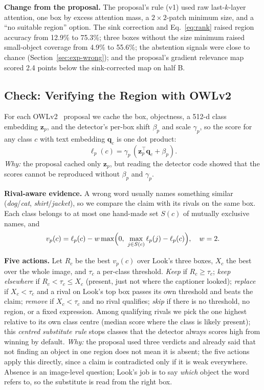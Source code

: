 \documentclass[conference]{IEEEtran}
\begin{document}
\textbf{Change from the proposal.} The proposal's rule (v1) used raw last-$k$-layer attention, one box by
excess attention mass, a $2\times2$-patch minimum size, and a ``no suitable region'' option. The sink
correction and Eq.~\eqref{eq:rank} raised region accuracy from 12.9\% to 75.3\%; three boxes without the size
minimum raised small-object coverage from 4.9\% to 55.6\%; the abstention signals were close to chance
(Section~\ref{sec:exp-wrong}); and the proposal's gradient relevance map~\cite{chefer2021generic} scored 2.4
points below the sink-corrected map on half B.

\subsection{Check: Verifying the Region with OWLv2}
\label{sec:design-check}
For each OWLv2~\cite{minderer2023scaling} proposal we cache the box, objectness, a 512-d class embedding
$\mathbf{z}_p$, and the detector's per-box shift $\beta_p$ and scale $\gamma_p$, so the score for any class $c$
with text embedding $\mathbf{q}_c$ is one dot product:
\begin{equation}
\ell_p(c) = \gamma_p\,(\mathbf{z}_p^{\top}\mathbf{q}_c + \beta_p).
\label{eq:owl}
\end{equation}
\emph{Why:} the proposal cached only $\mathbf{z}_p$, but reading the detector code showed that the scores
cannot be reproduced without $\beta_p$ and $\gamma_p$.

\textbf{Rival-aware evidence.} A wrong word usually names something similar (\emph{dog}/\emph{cat},
\emph{shirt}/\emph{jacket}), so we compare the claim with its rivals on the same box. Each class belongs to at
most one hand-made set $S(c)$ of mutually exclusive names, and
\begin{equation}
v_p(c) = \ell_p(c) - w \max\Bigl(0,\ \max_{j\in S(c)} \ell_p(j) - \ell_p(c)\Bigr),\quad w=2.
\label{eq:rival}
\end{equation}

\textbf{Five actions.} Let $R_c$ be the best $v_p(c)$ over Look's three boxes, $X_c$ the best over the whole
image, and $\tau_c$ a per-class threshold. \emph{Keep} if $R_c\ge\tau_c$; \emph{keep elsewhere} if
$R_c<\tau_c\le X_c$ (present, just not where the captioner looked); \emph{replace} if $X_c<\tau_c$ and a rival
on Look's top box passes its own threshold and beats the claim; \emph{remove} if $X_c<\tau_c$ and no rival
qualifies; \emph{skip} if there is no threshold, no region, or a fixed expression. Among qualifying rivals we
pick the one highest relative to its own class centre (median score where the class is likely present); this
\emph{centred substitute rule} stops classes that the detector always scores high from winning by default.
\emph{Why:} the proposal used three verdicts and already said that not finding an object in one region does
not mean it is absent; the five actions apply this directly, since a claim is contradicted only if it is weak
everywhere. Absence is an image-level question; Look's job is to say \emph{which} object the word refers to,
so the substitute is read from the right box.
\end{document}
